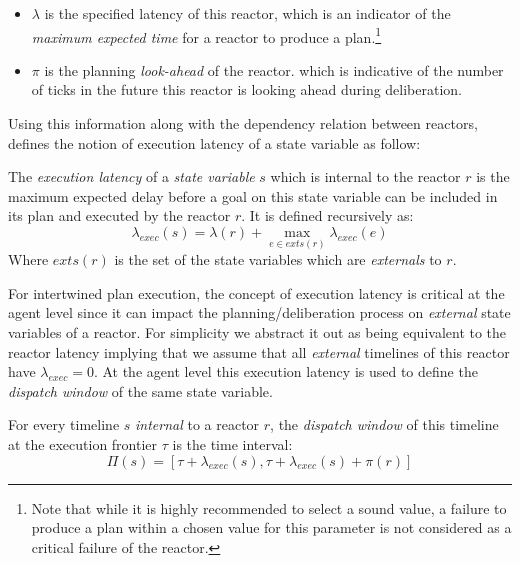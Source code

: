 \begin{itemize}

\item $\lambda$ is the specified latency of this reactor, which is an
  indicator of the \emph{maximum expected time} for a reactor to
  produce a plan.\footnote{Note that while it is highly recommended to
    select a sound value, a failure to produce a plan within a chosen
    value for this parameter is not considered as a critical failure
    of the reactor.}

\item $\pi$ is the planning \emph{look-ahead} of the reactor. which is
  indicative of the number of ticks in the future this reactor is
  looking ahead during deliberation.

\end{itemize}

Using this information along with the dependency relation between
reactors, \rx defines the notion of execution latency of a state
variable as follow:

\begin{definition}
  The {\em execution latency} of a {\em state variable} $s$ which is
  internal to the reactor $r$ is the maximum expected delay before a
  goal on this state variable can be included in its plan and executed
  by the reactor $r$. It is defined recursively as: 
  \begin{equation*}
    \lambda_{exec}(s) = \lambda(r) + \max_{e \in exts(r)}
    \lambda_{exec}(e) 
  \end{equation*}
  Where  $exts(r)$ is the set of the state variables which are
  {\em externals} to $r$. 
\end{definition}

For intertwined plan execution, the concept of execution latency is
critical at the agent level since it can impact the
planning/deliberation process on {\em external} state variables of a
reactor. For simplicity we abstract it out as being equivalent to the
reactor latency implying that we assume that all {\em external}
timelines of this reactor have $\lambda_{exec} = 0$. At the \rx agent
level this execution latency is used to define the {\em dispatch
  window} of the same state variable.%

\begin{definition}
  \label{def:dispatch}
  For every timeline $s$ {\em internal} to a reactor $r$, the {\em
    dispatch window} of this timeline at the execution frontier $\tau$
  is the time interval:
  \begin{equation*}
    \Pi(s) = [\tau + \lambda_{exec}(s), \tau+\lambda_{exec}(s)+\pi(r)]
  \end{equation*}
\end{definition}

